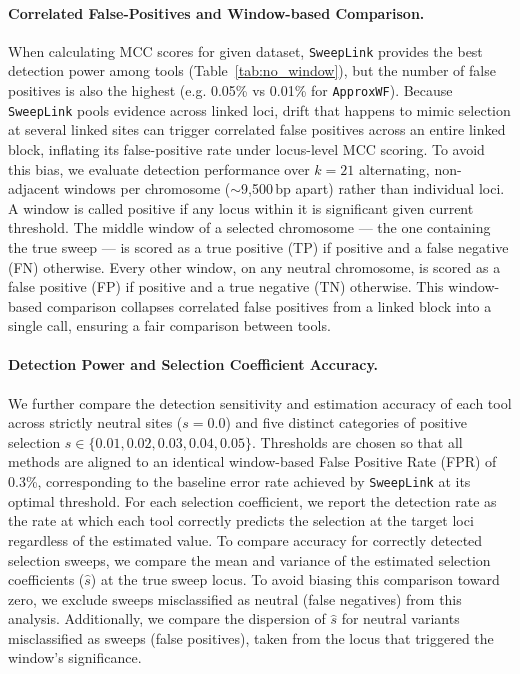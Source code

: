 \documentclass{article}
\newcommand{\SweepLink}{\texttt{SweepLink}\xspace}
\newcommand{\ApproxWF}{\texttt{ApproxWF}\xspace}
\begin{document}
\paragraph{Correlated False-Positives and Window-based Comparison.}
When calculating MCC scores for given dataset, \SweepLink provides the best detection power among tools (Table~\ref{tab:no_window}), but the number of false positives is also the highest (e.g. 0.05\% vs 0.01\% for \ApproxWF).
Because \SweepLink pools evidence across linked loci, drift that happens to mimic selection at several linked sites can trigger correlated false positives across an entire linked block, inflating its false-positive rate under locus-level MCC scoring.
To avoid this bias, we evaluate detection performance over $k=21$ alternating, non-adjacent windows per chromosome ($\sim$9{,}500\,bp apart) rather than individual loci.
A window is called positive if any locus within it is significant given current threshold.
The middle window of a selected chromosome --- the one containing the true sweep --- is scored as a true positive (TP) if positive and a false negative (FN) otherwise.
Every other window, on any neutral chromosome, is scored as a false positive (FP) if positive and a true negative (TN) otherwise.
This window-based comparison collapses correlated false positives from a linked block into a single call, ensuring a fair comparison between tools.

\paragraph{Detection Power and Selection Coefficient Accuracy.}
We further compare the detection sensitivity and estimation accuracy of each tool across strictly neutral sites ($s=0.0$) and five distinct categories of positive selection $s \in \{0.01, 0.02, 0.03, 0.04, 0.05\}$.
Thresholds are chosen so that all methods are aligned to an identical window-based False Positive Rate (FPR) of 0.3\%, corresponding to the baseline error rate achieved by \SweepLink at its optimal threshold.
For each selection coefficient, we report the detection rate as the rate at which each tool correctly predicts the selection at the target loci regardless of the estimated value. 
To compare accuracy for correctly detected selection sweeps, we compare the mean and variance of the estimated selection coefficients ($\hat{s}$) at the true sweep locus.
To avoid biasing this comparison toward zero, we exclude sweeps misclassified as neutral (false negatives) from this analysis.
Additionally, we compare the dispersion of $\hat{s}$ for neutral variants
misclassified as sweeps (false positives), taken from the locus that triggered the
window's significance.
\end{document}
